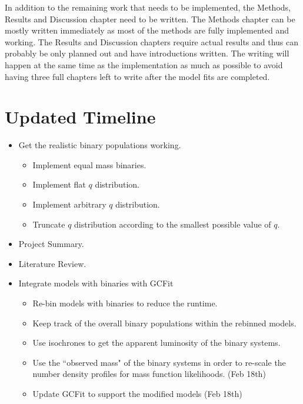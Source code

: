 \documentclass[12pt,letterpaper]{article}
\begin{document}
In addition to the remaining work that needs to be implemented, the Methods, Results and Discussion
chapter need to be written. The Methods chapter can be mostly written immediately as most of the
methods are fully implemented and working. The Results and Discussion chapters require actual
results and thus can probably be only planned out and have introductions written. The writing will
happen at the same time as the implementation as much as possible to avoid having three full
chapters left to write after the model fits are completed.



\section{Updated Timeline}
\begin{itemize}
	\item Get the realistic binary populations working. \checkmark
	      \begin{itemize}
		      \item Implement equal mass binaries. \checkmark
		      \item Implement flat $q$ distribution. \checkmark
		      \item Implement arbitrary $q$ distribution. \checkmark
		      \item Truncate $q$ distribution according to the smallest possible value of $q$. \checkmark
	      \end{itemize}
	\item Project Summary. \checkmark
	\item Literature Review. \checkmark
	\item Integrate models with binaries with GCFit
	      \begin{itemize}
		      \item Re-bin models with binaries to reduce the runtime. \checkmark
		      \item Keep track of the overall binary populations within the rebinned models. \checkmark
		      \item Use isochrones to get the apparent luminosity of the binary systems. \checkmark
		      \item Use the ``observed mass" of the binary systems in order to re-scale the
		            number density profiles for mass function likelihoods. (Feb 18th)
		      \item Update GCFit to support the modified models (Feb 18th)
	      \end{itemize}


\end{itemize}
\end{document}
